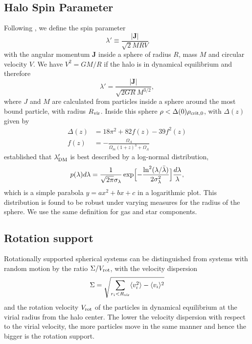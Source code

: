 \documentclass[useAMS,usenatbib]{mn2e}
\begin{document}
\subsection{Halo Spin Parameter}
%
Following \cite{Bullock2001}, we define the spin parameter
%
\begin{equation}\label{eq:lprime0}
  \lambda'\equiv\frac{|\mathbf{J}|}{\sqrt{2}MRV}
\end{equation}
%
with the angular momentum $\mathbf{J}$ inside a sphere of radius $R$, mass $M$
and circular velocity $V$. We have $V^2=GM/R$ if the halo is in dynamical
equilibrium and therefore
%
\begin{equation} \label{eq:lprime1}
	\lambda'=\frac{|\mathbf{J}|}{\sqrt{2GR}M^{3/2}},
\end{equation}
%
where $J$ and $M$ are calculated from particles inside a sphere around the
most bound particle, with radius $R_{\rm vir}$. Inside this sphere
$\rho<\Delta(0)\rho_{\rm crit,0}$, with $\Delta(z)$ given by \citep{Bryan1998}
%
\begin{align} \label{eq:Deltaz}
	\Delta(z)&=18\pi^2+82f(z)-39f^2(z)\\
	f(z)&=-\frac{\Omega_\Lambda}{\Omega_m(1+z)^3+\Omega_\Lambda}
\end{align}
%
\cite{Bullock2001} established that $\lambda'_{\rm DM}$ is best described by a
log-normal distribution,
%
\begin{equation} \label{eq:plambda}
  p(\lambda)d\lambda=
  \frac{1}{\sqrt{2\pi}\sigma_\lambda}
  \exp\Bigl[-\frac{\ln^2(\lambda/\bar{\lambda})}{2\sigma_\lambda^2}\Bigr]
  \frac{d\lambda}{\lambda},
\end{equation}
%
which is a simple parabola $y=ax^2+bx+c$ in a logarithmic plot. This
distribution is found to be robust under varying measures for the radius of
the sphere. We use the same definition for gas and star components.
%
\subsection{Rotation support}
%
Rotationally supported spherical systems can be distinguished from systems
with random motion by the ratio $\Sigma/V_{\rm rot}$, with the velocity
dispersion
%
\begin{equation} \label{eq:sigma}
	\Sigma = \sqrt{\sum_{r_i<R_{\rm vir}}
			 \langle v_i^2\rangle-\langle v_i\rangle^2}
\end{equation}
%
and the rotation velocity $V_{\rm rot}$ of the particles in dynamical
equilibrium at the virial radius from the halo center. The lower the velocity
dispersion with respect to the virial velocity, the more particles move in the
same manner and hence the bigger is the rotation support.
%
%
\end{document}
